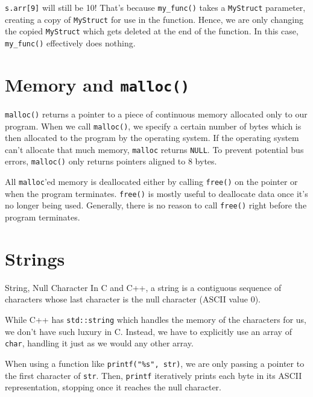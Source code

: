 \documentclass[code]{amznotes}
\begin{document}
\texttt{s.arr[9]} will still be 10! That's because \texttt{my\_func()} takes a \texttt{MyStruct} parameter, creating a copy of \texttt{MyStruct} for use in the function. Hence, we are only changing the copied \texttt{MyStruct} which gets deleted at the end of the function.
In this case, \texttt{my\_func()} effectively does nothing.

\section{Memory and \texttt{malloc()}}
\texttt{malloc()} returns a pointer to a piece of continuous memory allocated only to our program. When we call \texttt{malloc()}, we specify a certain number of bytes which is then allocated to the program by the operating system. If the operating system can't allocate that much memory, \texttt{malloc} returns \texttt{NULL}. To prevent potential bus errors, \texttt{malloc()} only returns pointers aligned to $8$ bytes.

All \texttt{malloc}'ed memory is deallocated either by calling \texttt{free()} on the pointer or when the program terminates. \texttt{free()} is mostly useful to deallocate data once it's no longer being used. Generally, there is no reason to call \texttt{free()} right before the program terminates.


\section{Strings}

\begin{dfnbox}{String, Null Character}{}
In C and C++, a string is a contiguous sequence of characters whose last character is the null character (ASCII value 0).
\end{dfnbox}

While C++ has \texttt{std::string} which handles the memory of the characters for us, we don't have such luxury in C. Instead, we have to explicitly use an array of \texttt{char}, handling it just as we would any other array.

When using a function like \texttt{printf("\%s", str)}, we are only passing a pointer to the first character of \texttt{str}. Then, \texttt{printf} iteratively prints each byte in its ASCII representation, stopping once it reaches the null character.
\end{document}
